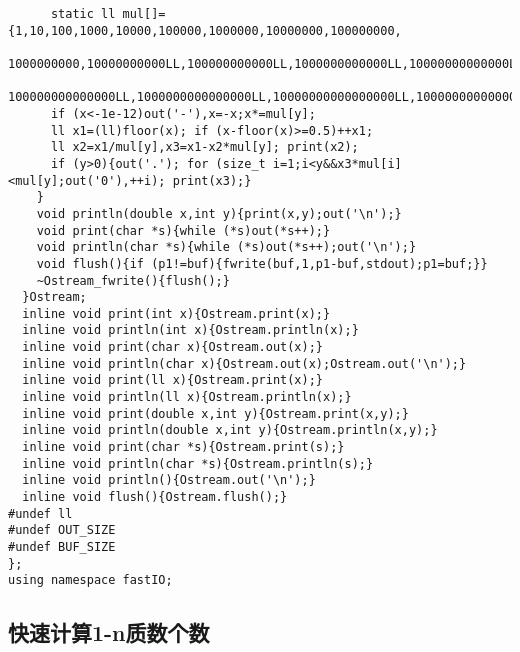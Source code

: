 \begin{lstlisting}
      static ll mul[]={1,10,100,1000,10000,100000,1000000,10000000,100000000,
        1000000000,10000000000LL,100000000000LL,1000000000000LL,10000000000000LL,
        100000000000000LL,1000000000000000LL,10000000000000000LL,100000000000000000LL};
      if (x<-1e-12)out('-'),x=-x;x*=mul[y];
      ll x1=(ll)floor(x); if (x-floor(x)>=0.5)++x1;
      ll x2=x1/mul[y],x3=x1-x2*mul[y]; print(x2);
      if (y>0){out('.'); for (size_t i=1;i<y&&x3*mul[i]<mul[y];out('0'),++i); print(x3);}
    }
    void println(double x,int y){print(x,y);out('\n');}
    void print(char *s){while (*s)out(*s++);}
    void println(char *s){while (*s)out(*s++);out('\n');}
    void flush(){if (p1!=buf){fwrite(buf,1,p1-buf,stdout);p1=buf;}}
    ~Ostream_fwrite(){flush();}
  }Ostream;
  inline void print(int x){Ostream.print(x);}
  inline void println(int x){Ostream.println(x);}
  inline void print(char x){Ostream.out(x);}
  inline void println(char x){Ostream.out(x);Ostream.out('\n');}
  inline void print(ll x){Ostream.print(x);}
  inline void println(ll x){Ostream.println(x);}
  inline void print(double x,int y){Ostream.print(x,y);}
  inline void println(double x,int y){Ostream.println(x,y);}
  inline void print(char *s){Ostream.print(s);}
  inline void println(char *s){Ostream.println(s);}
  inline void println(){Ostream.out('\n');}
  inline void flush(){Ostream.flush();}
#undef ll
#undef OUT_SIZE
#undef BUF_SIZE
};
using namespace fastIO;
\end{lstlisting}


\subsection{快速计算1-n质数个数}

